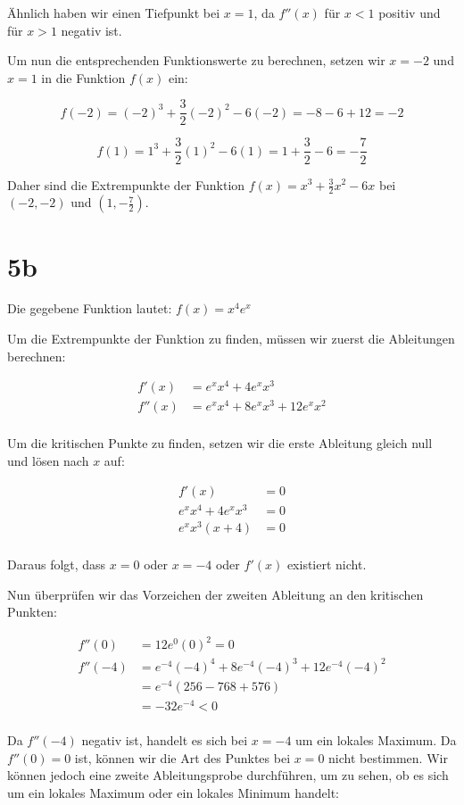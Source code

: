 \documentclass{report}
\begin{document}
Ähnlich haben wir einen Tiefpunkt bei $x=1$, da $f''(x)$ für $x<1$ positiv und für $x>1$ negativ ist.

Um nun die entsprechenden Funktionswerte zu berechnen, setzen wir $x=-2$ und $x=1$ in die Funktion $f(x)$ ein:

$$f(-2) = (-2)^3 + \frac{3}{2}(-2)^2 - 6(-2) = -8 - 6 + 12 = -2$$

$$f(1) = 1^3 + \frac{3}{2}(1)^2 - 6(1) = 1 + \frac{3}{2} - 6 = -\frac{7}{2}$$

Daher sind die Extrempunkte der Funktion $f(x) = x^3 + \frac{3}{2}x^2 - 6x$ bei $(-2,-2)$ und $(1,-\frac{7}{2})$.

\section*{5b}
Die gegebene Funktion lautet: $f(x) = x^4 e^x$

Um die Extrempunkte der Funktion zu finden, müssen wir zuerst die Ableitungen berechnen:

\begin{align*}
f'(x) &= e^x x^4 + 4 e^x x^3 \\
f''(x) &= e^x x^4 + 8 e^x x^3 + 12 e^x x^2 \\
\end{align*}

Um die kritischen Punkte zu finden, setzen wir die erste Ableitung gleich null und lösen nach $x$ auf:

\begin{align*}
f'(x) &= 0 \\
e^x x^4 + 4 e^x x^3 &= 0 \\
e^x x^3 (x+4) &= 0 \\
\end{align*}

Daraus folgt, dass $x = 0$ oder $x = -4$ oder $f'(x)$ existiert nicht.

Nun überprüfen wir das Vorzeichen der zweiten Ableitung an den kritischen Punkten:

\begin{align*}
f''(0) &= 12 e^0 (0)^2 = 0 \\
f''(-4) &= e^{-4} (-4)^4 + 8 e^{-4} (-4)^3 + 12 e^{-4} (-4)^2 \\
&= e^{-4} (256 - 768 + 576) \\
&= -32e^{-4} < 0 \\
\end{align*}

Da $f''(-4)$ negativ ist, handelt es sich bei $x=-4$ um ein lokales Maximum. Da $f''(0) = 0$ ist, können wir die Art des Punktes bei $x=0$ nicht bestimmen. Wir können jedoch eine zweite Ableitungsprobe durchführen, um zu sehen, ob es sich um ein lokales Maximum oder ein lokales Minimum handelt:
\end{document}
